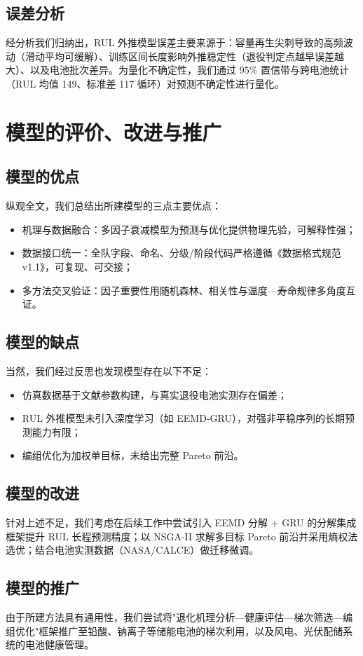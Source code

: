 \documentclass[withoutpreface]{cumcmthesis}
\begin{document}
\subsection{误差分析}
经分析我们归纳出，RUL 外推模型误差主要来源于：容量再生尖刺导致的高频波动（滑动平均可缓解）、训练区间长度影响外推稳定性（退役判定点越早误差越大）、以及电池批次差异。为量化不确定性，我们通过 95\% 置信带与跨电池统计（RUL 均值 149、标准差 117 循环）对预测不确定性进行量化。

\section{模型的评价、改进与推广}
\subsection{模型的优点}
纵观全文，我们总结出所建模型的三点主要优点：
\begin{itemize}[itemindent=2em]
\item 机理与数据融合：多因子衰减模型为预测与优化提供物理先验，可解释性强；
\item 数据接口统一：全队字段、命名、分级/阶段代码严格遵循《数据格式规范 v1.1》，可复现、可交接；
\item 多方法交叉验证：因子重要性用随机森林、相关性与温度—寿命规律多角度互证。
\end{itemize}

\subsection{模型的缺点}
当然，我们经过反思也发现模型存在以下不足：
\begin{itemize}[itemindent=2em]
\item 仿真数据基于文献参数构建，与真实退役电池实测存在偏差；
\item RUL 外推模型未引入深度学习（如 EEMD-GRU），对强非平稳序列的长期预测能力有限；
\item 编组优化为加权单目标，未给出完整 Pareto 前沿。
\end{itemize}

\subsection{模型的改进}
针对上述不足，我们考虑在后续工作中尝试引入 EEMD 分解 + GRU 的分解集成框架提升 RUL 长程预测精度；以 NSGA-II 求解多目标 Pareto 前沿并采用熵权法选优；结合电池实测数据（NASA/CALCE）做迁移微调。

\subsection{模型的推广}
由于所建方法具有通用性，我们尝试将"退化机理分析—健康评估—梯次筛选—编组优化"框架推广至铅酸、钠离子等储能电池的梯次利用，以及风电、光伏配储系统的电池健康管理。
\end{document}
